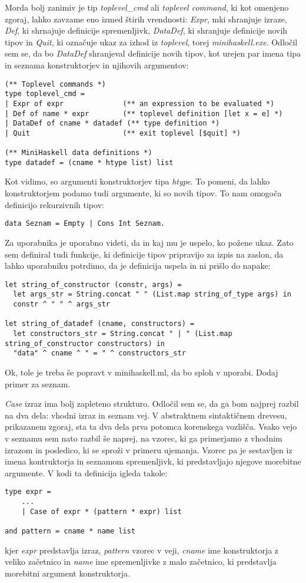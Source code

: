 \documentclass[12pt,a4paper,openany]{book}
\begin{document}
Morda bolj zanimiv je tip \emph{toplevel_cmd} ali \textit{toplevel command}, ki kot omenjeno zgoraj, lahko zavzame eno izmed štirih vrendnosti: \emph{Expr}, mki shranjuje izraze, 
\emph{Def}, ki shrnajuje definicije spremenljivk, \emph{DataDef}, ki shranjuje definicije novih tipov in \emph{Quit}, ki označuje ukaz za izhod iz \emph{toplevel}, torej 
\emph{minihaskell.exe}. Odločil sem se, da bo \emph{DataDef} shranjeval definicije novih tipov, kot urejen par imena tipa in seznama konstruktorjev in njihovih argumentov:
\begin{lstlisting}
(** Toplevel commands *)
type toplevel_cmd =
| Expr of expr              (** an expression to be evaluated *)
| Def of name * expr        (** toplevel definition [let x = e] *)
| DataDef of cname * datadef (** type definition *)
| Quit                      (** exit toplevel [$quit] *)

(** MiniHaskell data definitions *)
type datadef = (cname * htype list) list
\end{lstlisting}
Kot vidimo, so argumenti konstruktorjev tipa \emph{htype}. To pomeni, da lahko konstruktorjem podamo tudi argumente, ki so novih tipov. To nam omogoča definicijo rekurzivnih tipov:
\begin{lstlisting}
data Seznam = Empty | Cons Int Seznam.
\end{lstlisting}

Za uporabnika je uporabno videti, da in kaj mu je uspelo, ko požene ukaz. Zato sem definiral tudi funkcije, ki definicije tipov pripravijo za izpis na zaslon, da lahko uporabniku 
potrdimo, da je definicija uspela in ni prišlo do napake:
\begin{lstlisting}
let string_of_constructor (constr, args) =
  let args_str = String.concat " " (List.map string_of_type args) in 
  constr ^ " " ^ args_str

let string_of_datadef (cname, constructors) =
  let constructors_str = String.concat " | " (List.map string_of_constructor constructors) in
  "data" ^ cname ^ " = " ^ constructors_str
\end{lstlisting}
Ok, tole je treba še popravt v minihaskell.ml, da bo sploh v uporabi. Dodaj primer za seznam.

\emph{Case} izraz ima bolj zapleteno strukturo. Odločil sem se, da ga bom najprej razbil na dva dela: vhodni izraz in seznam vej. V abstraktnem sintaktičnem drevesu, prikazanem zgoraj, 
sta ta dva dela prva potomca korenskega vozlišča. Vsako vejo v seznamu sem nato razbil še naprej, na vzorec, ki ga primerjamo z vhodnim izrazom in posledico, ki se sproži v primeru ujemanja. 
Vzorec pa je sestavljen iz imena kontruktorja in seznamom spremenljivk, ki predstavljajo njegove morebitne argumente. V kodi ta definicija igleda takole:
\begin{lstlisting}
type expr =
    ...
    | Case of expr * (pattern * expr) list

and pattern = cname * name list
\end{lstlisting}
kjer \emph{expr} predstavlja izraz, \emph{pattern} vzorec v veji, \emph{cname} ime konstruktorja z veliko začetnico in \emph{name} ime spremenljivke z malo začetnico, ki predstavlja morebitni 
argument konstruktorja. 
\end{document}
